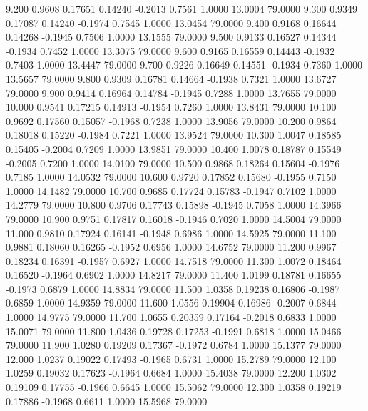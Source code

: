    9.200   0.9608   0.17651   0.14240  -0.2013   0.7561   1.0000  13.0004  79.0000
   9.300   0.9349   0.17087   0.14240  -0.1974   0.7545   1.0000  13.0454  79.0000
   9.400   0.9168   0.16644   0.14268  -0.1945   0.7506   1.0000  13.1555  79.0000
   9.500   0.9133   0.16527   0.14344  -0.1934   0.7452   1.0000  13.3075  79.0000
   9.600   0.9165   0.16559   0.14443  -0.1932   0.7403   1.0000  13.4447  79.0000
   9.700   0.9226   0.16649   0.14551  -0.1934   0.7360   1.0000  13.5657  79.0000
   9.800   0.9309   0.16781   0.14664  -0.1938   0.7321   1.0000  13.6727  79.0000
   9.900   0.9414   0.16964   0.14784  -0.1945   0.7288   1.0000  13.7655  79.0000
  10.000   0.9541   0.17215   0.14913  -0.1954   0.7260   1.0000  13.8431  79.0000
  10.100   0.9692   0.17560   0.15057  -0.1968   0.7238   1.0000  13.9056  79.0000
  10.200   0.9864   0.18018   0.15220  -0.1984   0.7221   1.0000  13.9524  79.0000
  10.300   1.0047   0.18585   0.15405  -0.2004   0.7209   1.0000  13.9851  79.0000
  10.400   1.0078   0.18787   0.15549  -0.2005   0.7200   1.0000  14.0100  79.0000
  10.500   0.9868   0.18264   0.15604  -0.1976   0.7185   1.0000  14.0532  79.0000
  10.600   0.9720   0.17852   0.15680  -0.1955   0.7150   1.0000  14.1482  79.0000
  10.700   0.9685   0.17724   0.15783  -0.1947   0.7102   1.0000  14.2779  79.0000
  10.800   0.9706   0.17743   0.15898  -0.1945   0.7058   1.0000  14.3966  79.0000
  10.900   0.9751   0.17817   0.16018  -0.1946   0.7020   1.0000  14.5004  79.0000
  11.000   0.9810   0.17924   0.16141  -0.1948   0.6986   1.0000  14.5925  79.0000
  11.100   0.9881   0.18060   0.16265  -0.1952   0.6956   1.0000  14.6752  79.0000
  11.200   0.9967   0.18234   0.16391  -0.1957   0.6927   1.0000  14.7518  79.0000
  11.300   1.0072   0.18464   0.16520  -0.1964   0.6902   1.0000  14.8217  79.0000
  11.400   1.0199   0.18781   0.16655  -0.1973   0.6879   1.0000  14.8834  79.0000
  11.500   1.0358   0.19238   0.16806  -0.1987   0.6859   1.0000  14.9359  79.0000
  11.600   1.0556   0.19904   0.16986  -0.2007   0.6844   1.0000  14.9775  79.0000
  11.700   1.0655   0.20359   0.17164  -0.2018   0.6833   1.0000  15.0071  79.0000
  11.800   1.0436   0.19728   0.17253  -0.1991   0.6818   1.0000  15.0466  79.0000
  11.900   1.0280   0.19209   0.17367  -0.1972   0.6784   1.0000  15.1377  79.0000
  12.000   1.0237   0.19022   0.17493  -0.1965   0.6731   1.0000  15.2789  79.0000
  12.100   1.0259   0.19032   0.17623  -0.1964   0.6684   1.0000  15.4038  79.0000
  12.200   1.0302   0.19109   0.17755  -0.1966   0.6645   1.0000  15.5062  79.0000
  12.300   1.0358   0.19219   0.17886  -0.1968   0.6611   1.0000  15.5968  79.0000
